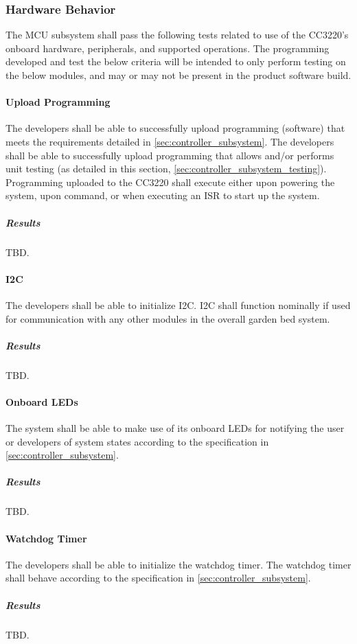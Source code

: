 \subsubsection{Hardware Behavior}
The MCU subsystem shall pass the following tests related to use of the
CC3220's onboard hardware, peripherals, and supported operations. The
programming developed and test the below criteria will be intended to only
perform testing on the below modules, and may or may not be present in the
product software build.

\paragraph{Upload Programming} The developers shall be able to successfully
upload programming (software) that meets the requirements detailed in
\autoref{sec:controller_subsystem}. The developers shall be able to
successfully upload programming that allows and/or performs unit testing
(as detailed in this section, \autoref{sec:controller_subsystem_testing}).
Programming uploaded to the CC3220 shall execute either upon powering the
system, upon command, or when executing an ISR to start up the system.
\subparagraph{Results} TBD.

\paragraph{I2C} The developers shall be able to initialize I2C. I2C shall
function nominally if used for communication with any other modules in the
overall garden bed system.
\subparagraph{Results} TBD.

\paragraph{Onboard LEDs} The system shall be able to make use of its onboard
LEDs for notifying the user or developers of system states according to the specification in \autoref{sec:controller_subsystem}.
\subparagraph{Results} TBD.

\paragraph{Watchdog Timer} The developers shall be able to initialize the
watchdog timer. The watchdog timer shall behave according to the specification in \autoref{sec:controller_subsystem}.
\subparagraph{Results} TBD.

